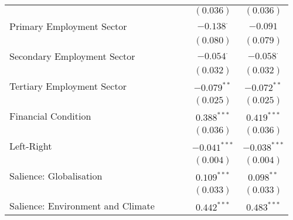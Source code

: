 \begin{center}
\begin{tiny}
\begin{longtable}{l@{} c@{} c@{} c@{} c@{} c@{}}
                                                      &                &                &                & $(0.036)$        & $(0.036)$        \\
\quad Primary Employment Sector                       &                &                &                & $-0.138^{\cdot}$ & $-0.091$         \\
                                                      &                &                &                & $(0.080)$        & $(0.079)$        \\
\quad Secondary Employment Sector                     &                &                &                & $-0.054^{\cdot}$ & $-0.058^{\cdot}$ \\
                                                      &                &                &                & $(0.032)$        & $(0.032)$        \\
\quad Tertiary Employment Sector                      &                &                &                & $-0.079^{**}$    & $-0.072^{**}$    \\
                                                      &                &                &                & $(0.025)$        & $(0.025)$        \\
\quad Financial Condition                             &                &                &                & $0.388^{***}$    & $0.419^{***}$    \\
                                                      &                &                &                & $(0.036)$        & $(0.036)$        \\
\quad Left-Right                                      &                &                &                & $-0.041^{***}$   & $-0.038^{***}$   \\
                                                      &                &                &                & $(0.004)$        & $(0.004)$        \\
\quad Salience: Globalisation                         &                &                &                & $0.109^{***}$    & $0.098^{**}$     \\
                                                      &                &                &                & $(0.033)$        & $(0.033)$        \\
\quad Salience: Environment and Climate               &                &                &                & $0.442^{***}$    & $0.483^{***}$    \\

\end{longtable}
\end{tiny}
\end{center}
